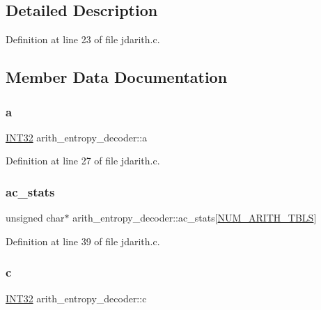 \subsection{Detailed Description}


Definition at line 23 of file jdarith.\+c.



\subsection{Member Data Documentation}
\mbox{\label{structarith__entropy__decoder_afb33bbe1e85d3d76b8b119a46db68a77}} 
\subsubsection{\texorpdfstring{a}{a}}
{\footnotesize\ttfamily \mbox{\hyperlink{jmorecfg_8h_a0cb58e7e6f0bad369840a52e54a56ae0}{I\+N\+T32}} arith\+\_\+entropy\+\_\+decoder\+::a}



Definition at line 27 of file jdarith.\+c.

\mbox{\label{structarith__entropy__decoder_ad24b1d5f8dae5839bca9cc749bf9f06e}} 
\subsubsection{\texorpdfstring{ac\_stats}{ac\_stats}}
{\footnotesize\ttfamily unsigned char$\ast$ arith\+\_\+entropy\+\_\+decoder\+::ac\+\_\+stats\mbox{[}\mbox{\hyperlink{jpeglib_8h_a4efb0fccc8d9db72ca18f32a26fad6ab}{N\+U\+M\+\_\+\+A\+R\+I\+T\+H\+\_\+\+T\+B\+LS}}\mbox{]}}



Definition at line 39 of file jdarith.\+c.

\mbox{\label{structarith__entropy__decoder_abad1e8f477d4015c7069855679885618}} 
\subsubsection{\texorpdfstring{c}{c}}
{\footnotesize\ttfamily \mbox{\hyperlink{jmorecfg_8h_a0cb58e7e6f0bad369840a52e54a56ae0}{I\+N\+T32}} arith\+\_\+entropy\+\_\+decoder\+::c}



